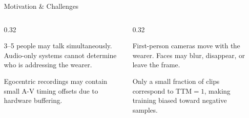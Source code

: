 \documentclass[aspectratio=169, 10pt]{beamer}
\begin{document}
\begin{frame}{Motivation \& Challenges}
\small

\begin{columns}[T,onlytextwidth]

\begin{column}{0.32\textwidth}

\begin{tcolorbox}[
redcard,
title={\small Multiple Speakers},
boxsep=2pt,
left=3pt,right=3pt,
top=3pt,bottom=3pt]

\footnotesize
3--5 people may talk simultaneously. Audio-only systems cannot determine who is addressing the wearer.

\end{tcolorbox}

\vspace{2pt}

\begin{tcolorbox}[
tealcard,
title={\small Audio-Visual Sync Issues},
boxsep=2pt,
left=3pt,right=3pt,
top=3pt,bottom=3pt]

\footnotesize
Egocentric recordings may contain small A-V timing offsets due to hardware buffering.

\end{tcolorbox}

\end{column}

\begin{column}{0.32\textwidth}

\begin{tcolorbox}[
bluecard,
title={\small Occlusions \& Camera Motion},
boxsep=2pt,
left=3pt,right=3pt,
top=3pt,bottom=3pt]

\footnotesize
First-person cameras move with the wearer. Faces may blur, disappear, or leave the frame.

\end{tcolorbox}

\vspace{2pt}

\begin{tcolorbox}[
orangecard,
title={\small Class Imbalance},
boxsep=2pt,
left=3pt,right=3pt,
top=3pt,bottom=3pt]

\footnotesize
Only a small fraction of clips correspond to TTM$=1$, making training biased toward negative samples.

\end{tcolorbox}

\end{column}


\end{columns}
\end{frame}
\end{document}
